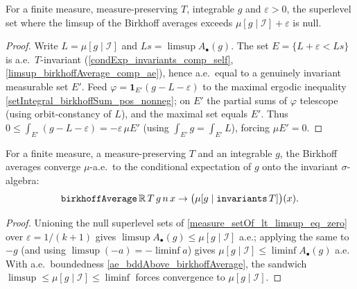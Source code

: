 \begin{proposition}\label{measure_setOf_lt_limsup_eq_zero}
  \leanok
  For a finite measure, measure-preserving \(T\), integrable \(g\) and
  \(\varepsilon > 0\), the superlevel set where the limsup of the Birkhoff
  averages exceeds \(\mu[g\mid\mathcal I] + \varepsilon\) is null.
\end{proposition}
\begin{proof}\leanok
  Write \(L = \mu[g\mid\mathcal I]\) and \(Ls = \limsup A_\bullet(g)\). The set
  \(E = \{L + \varepsilon < Ls\}\) is a.e.\ \(T\)-invariant
  (\cref{condExp_invariants_comp_self}, \cref{limsup_birkhoffAverage_comp_ae}),
  hence a.e.\ equal to a genuinely invariant measurable set \(E'\). Feed
  \(\varphi = \mathbf 1_{E'}(g - L - \varepsilon)\) to the maximal ergodic
  inequality \cref{setIntegral_birkhoffSum_pos_nonneg}; on \(E'\) the partial
  sums of \(\varphi\) telescope (using orbit-constancy of \(L\)), and the
  maximal set equals \(E'\). Thus
  \(0 \le \int_{E'}(g - L - \varepsilon) = -\varepsilon\,\mu E'\) (using
  \(\int_{E'} g = \int_{E'} L\)), forcing \(\mu E' = 0\).
\end{proof}

\begin{theorem}\label{tendsto_birkhoffAverage_ae}
  \leanok
  For a finite measure, a measure-preserving \(T\) and an integrable \(g\), the
  Birkhoff averages converge \(\mu\)-a.e.\ to the conditional expectation of
  \(g\) onto the invariant \(\sigma\)-algebra:
  \[
    \texttt{birkhoffAverage}\,\mathbb{R}\,T\,g\,n\,x \to
      \big(\mu[g \mid \texttt{invariants}\,T]\big)(x).
  \]
\end{theorem}
\begin{proof}\leanok
  Unioning the null superlevel sets of \cref{measure_setOf_lt_limsup_eq_zero}
  over \(\varepsilon = 1/(k+1)\) gives \(\limsup A_\bullet(g) \le
  \mu[g\mid\mathcal I]\) a.e.; applying the same to \(-g\) (and using
  \(\limsup(-a) = -\liminf a\)) gives \(\mu[g\mid\mathcal I] \le
  \liminf A_\bullet(g)\) a.e. With a.e.\ boundedness
  \cref{ae_bddAbove_birkhoffAverage}, the sandwich
  \(\limsup \le \mu[g\mid\mathcal I] \le \liminf\) forces convergence to
  \(\mu[g\mid\mathcal I]\).
\end{proof}

